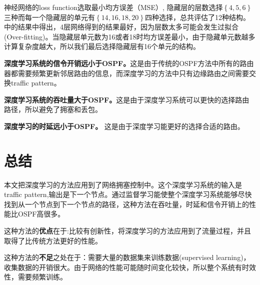 \documentclass[a4paper, 11pt]{article}
\begin{document}
\begin{CJK*}{UTF8}{gbsn}
神经网络的loss function选取最小均方误差（MSE）, 隐藏层的层数选择$\left \{ 4,5,6 \right \}$三种而每一个隐藏层的单元有$\left \{14,16,18,20 \right \}$四种选择，总共评估了12种结构。\cite{Kato2017:MWC}中的结果中得出，4层网络得到的结果最好，因为层数太多可能会发生过拟合(Over-fitting)。当隐藏层单元数为16或者18时均方误差最小，由于隐藏单元数越多计算复杂度越大，所以我们最后选择隐藏层有16个单元的结构。

\textbf{深度学习系统的信令开销远小于OSPF。}这是由于传统的OSPF方法中所有的路由器都需要频繁更新邻居路由的信息，而深度学习的方法中只有边缘路由之间需要交换traffic pattern。

\textbf{深度学习系统的吞吐量大于OSPF。}这是由于深度学习系统可以更快的选择路由路径，所以避免了拥塞和丢包。

\textbf{深度学习的时延远小于OSPF。} 这是由于深度学习能更好的选择合适的路由。

\section{总结}

本文把深度学习的方法应用到了网络拥塞控制中。这个深度学习系统的输入是traffic pattern,输出是下一个节点。通过监督学习能使整个深度学习系统能够尽快找到从一个节点到下一个节点的路径，这种方法在吞吐量，时延和信令开销上的性能比OSPF高很多。

这种方法的\textbf{优点}在于:比较有创新性，将深度学习的方法应用到了流量过程，并且取得了比传统方法更好的性能。

这种方法的\textbf{不足}之处在于：需要大量的数据集来训练数据(supervised learning)，收集数据的开销很大。由于网络的性能可能随时间变化较快，所以整个系统有时效性，需要频繁训练。

\end{CJK*}

\vspace{0.5cm} %


\vspace{0.5cm}

\noindent


%
%

\end{document}
